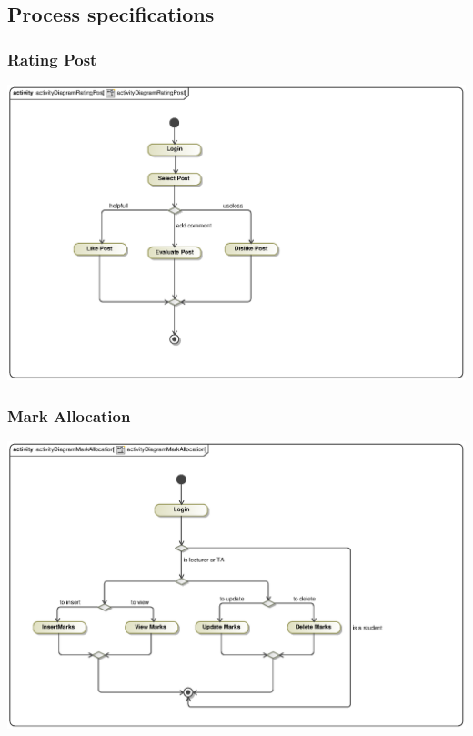 \documentclass[hidelinks, 12pt, oneside]{article}
\begin{document}
\subsection{Process specifications}
\subsubsection{Rating Post}
\includegraphics[scale=.9]{Kgomotso/graphics/activityDiagramRatingPost.eps}\\

\subsubsection{Mark Allocation}
\includegraphics[scale=.9]{Kgomotso/graphics/activityDiagramMarkAllocation.eps}\\
\end{document}
